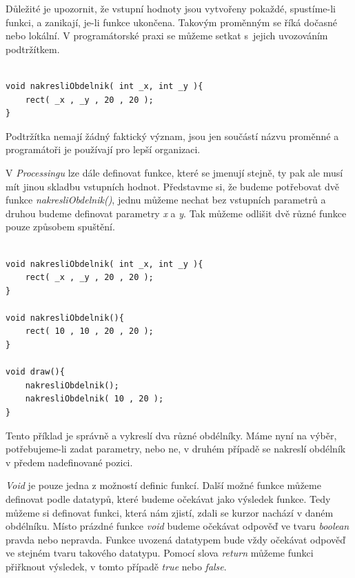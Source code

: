 \documentclass[10pt,twoside=true,open=right,cleardoublepage=empty,chapterprefix=true]{scrbook}
\newcommand{\vyraz}[1]{\textit{\gls{#1}}\index{#1}\label{#1}}
\newcommand{\lnb}{\linebreak}
\begin{document}
Důležité je upozornit, že vstupní hodnoty jsou vytvořeny pokaždé, \lnb spustíme-li funkci, a zanikají, je-li funkce ukončena. Takovým proměnným se říká dočasné nebo lokální. V programátorské praxi se můžeme setkat s~jejich uvozováním podtržítkem.

\pagebreak


\begin{lstlisting}

void nakresliObdelnik( int _x, int _y ){
	rect( _x , _y , 20 , 20 );
}

\end{lstlisting}

Podtržítka nemají žádný faktický význam, jsou jen součástí názvu proměnné a programátoři je používají pro lepší organizaci.

V {\em Processingu} lze dále definovat funkce, které se jmenují stejně, ty pak ale musí mít jinou skladbu vstupních hodnot. Představme si, že budeme potřebovat dvě funkce {\em nakresliObdelnik()}, jednu můžeme nechat bez vstupních parametrů a druhou budeme definovat parametry {\em x} a {\em y}. Tak můžeme odlišit dvě různé funkce pouze způsobem spuštění.

\begin{lstlisting}

void nakresliObdelnik( int _x, int _y ){
	rect( _x , _y , 20 , 20 );
}

void nakresliObdelnik(){
	rect( 10 , 10 , 20 , 20 );
}

void draw(){
	nakresliObdelnik();
	nakresliObdelnik( 10 , 20 );
}

\end{lstlisting}

Tento příklad je správně a vykreslí dva různé obdélníky. Máme nyní na výběr, potřebujeme-li zadat parametry, nebo ne, v druhém případě se nakreslí obdélník v předem nadefinované pozici.


{\em Void} je pouze jedna z možností definic funkcí. Další možné funkce můžeme definovat podle datatypů, které budeme očekávat jako výsledek funk\-ce. Tedy můžeme si definovat funkci, která nám zjistí, zdali se kurzor nachází v daném obdélníku. Místo prázdné funkce \vyraz{void} budeme očekávat odpověď ve tvaru \vyraz{boolean} pravda nebo nepravda. Funkce uvozená datatypem bude vždy očekávat odpověď ve stejném tvaru takového datatypu. Pomocí slova \vyraz{return} můžeme funkci přiřknout výsledek, v tomto případě \vyraz{true} nebo \vyraz{false}.

\pagebreak
\end{document}

